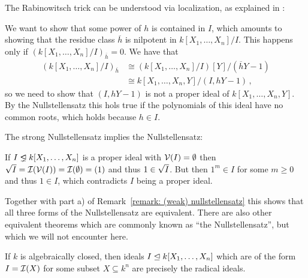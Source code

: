 \begin{remark}
  The Rabinowitsch trick can be understood via localization, as explained in \cite{MO90666}:
  
  We want to show that some power of $h$ is contained in $I$, which amounts to showing that the residue class $\overline{h}$ is nilpotent in $k[X_1, \dotsc, X_n]/I$.
  This happens only if $(k[X_1, \dotsc, X_n]/I)_{\overline{h}} = 0$.
  We have that
  \begin{align*}
            (k[X_1, \dotsc, X_n]/I)_{\overline{h}}
    &\cong  (k[X_1, \dotsc, X_n]/I)[Y]/(\overline{h}Y - 1)  \\
    &\cong  k[X_1, \dotsc, X_n,Y]/(I, hY - 1) \,,
  \end{align*}
  so we need to show that $(I, hY - 1)$ is not a proper ideal of $k[X_1, \dotsc, X_n, Y]$.
  By the Nullstellensatz this hols true if the polynomials of this ideal have no common roots, which holds because $h \in I$.
\end{remark}


\begin{remark}
  The strong Nullstellensatz implies the Nullstellensatz:
  
  If $I \idealneq k[X_1, \dotsc, X_n]$ is a proper ideal with $\mathcal{V}(I) = \emptyset$ then $\sqrt{I} = \mathcal{I}(\mathcal{V}(I)) = \mathcal{I}(\emptyset) = (1)$ and thus $1 \in \sqrt{I}$.
  But then $1^m \in I$ for some $m \geq 0$ and thus $1 \in I$, which contradicts $I$ being a proper ideal.
  
  Together with part a) of Remark~\ref{remark: (weak) nullstellensatz} this shows that all three forms of the Nullstellensatz are equivalent.
  There are also other equivalent theorems which are commonly known as \enquote{the Nullstellensatz}, but which we will not encounter here.
\end{remark}


\begin{corollary}
  \label{corollary: vanishing ideals are precisely radical ideals}
  If $k$ is algebraically closed, then ideals $I \trianglelefteq k[X_1, \dotsc, X_n]$ which are of the form $I = \mathcal{I}(X)$ for some subset $X \subseteq k^n$ are precisely the radical ideals.
\end{corollary}




